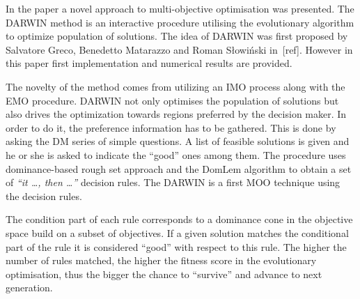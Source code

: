 In the paper a novel approach to multi-objective optimisation was
presented. The DARWIN method is an interactive procedure utilising the
evolutionary algorithm to optimize population of solutions. The idea of DARWIN
was first proposed by Salvatore Greco, Benedetto Matarazzo and Roman Słowiński
in~[ref]. However in this paper first implementation and numerical results are
provided.

The novelty of the method comes from utilizing an IMO process along with the
EMO procedure. DARWIN not only optimises the population of solutions but also
drives the optimization towards regions preferred by the decision maker. In
order to do it, the preference information has to be gathered. This is done by
asking the DM series of simple questions. A list of feasible solutions is
given and he or she is asked to indicate the ``good'' ones among them. The
procedure uses dominance-based rough set approach and the DomLem algorithm to
obtain a set of \textit{``it \dots, then \dots''} decision rules. The DARWIN
is a first MOO technique using the decision rules.

The condition part of each rule corresponds to a dominance cone in the
objective space build on a subset of objectives. If a given solution matches
the conditional part of the rule it is considered ``good'' with respect to
this rule. The higher the number of rules matched, the higher the fitness
score in the evolutionary optimisation, thus the bigger the chance to
``survive'' and advance to next generation.



